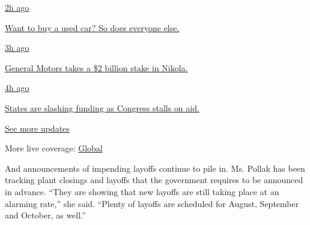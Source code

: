 \href{https://www.nytimes3xbfgragh.onion/live/2020/09/08/business/stock-market-today-coronavirus?action=click\&pgtype=Article\&state=default\&region=MAIN_CONTENT_1\&context=storylines_live_updates\#want-to-buy-a-used-car-so-does-everyone-else}{2h
ago}

\href{https://www.nytimes3xbfgragh.onion/live/2020/09/08/business/stock-market-today-coronavirus?action=click\&pgtype=Article\&state=default\&region=MAIN_CONTENT_1\&context=storylines_live_updates\#want-to-buy-a-used-car-so-does-everyone-else}{Want
to buy a used car? So does everyone else.}

\href{https://www.nytimes3xbfgragh.onion/live/2020/09/08/business/stock-market-today-coronavirus?action=click\&pgtype=Article\&state=default\&region=MAIN_CONTENT_1\&context=storylines_live_updates\#general-motors-takes-a-2-billion-stake-in-nikola}{3h
ago}

\href{https://www.nytimes3xbfgragh.onion/live/2020/09/08/business/stock-market-today-coronavirus?action=click\&pgtype=Article\&state=default\&region=MAIN_CONTENT_1\&context=storylines_live_updates\#general-motors-takes-a-2-billion-stake-in-nikola}{General
Motors takes a \$2 billion stake in Nikola.}

\href{https://www.nytimes3xbfgragh.onion/live/2020/09/08/business/stock-market-today-coronavirus?action=click\&pgtype=Article\&state=default\&region=MAIN_CONTENT_1\&context=storylines_live_updates\#states-are-slashing-funding-as-congress-stalls-on-aid}{4h
ago}

\href{https://www.nytimes3xbfgragh.onion/live/2020/09/08/business/stock-market-today-coronavirus?action=click\&pgtype=Article\&state=default\&region=MAIN_CONTENT_1\&context=storylines_live_updates\#states-are-slashing-funding-as-congress-stalls-on-aid}{States
are slashing funding as Congress stalls on aid.}

\href{https://www.nytimes3xbfgragh.onion/live/2020/09/08/business/stock-market-today-coronavirus?action=click\&pgtype=Article\&state=default\&region=MAIN_CONTENT_1\&context=storylines_live_updates}{See
more updates}

More live coverage:
\href{https://www.nytimes3xbfgragh.onion/2020/09/08/world/covid-19-coronavirus.html?action=click\&pgtype=Article\&state=default\&region=MAIN_CONTENT_1\&context=storylines_live_updates}{Global}

And announcements of impending layoffs continue to pile in. Ms. Pollak
has been tracking plant closings and layoffs that the government
requires to be announced in advance. ``They are showing that new layoffs
are still taking place at an alarming rate,'' she said. ``Plenty of
layoffs are scheduled for August, September and October, as well.''

